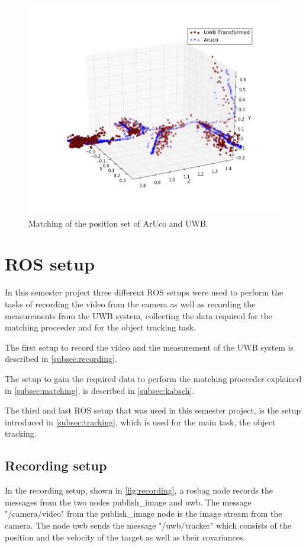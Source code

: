 \begin{figure}[ht!]\centering
	\includegraphics[width=1.0\textwidth]{figures/matching}
	\caption{Matching of the position set of ArUco and UWB.}\label{fig:matching}
\end{figure} 

\section{ROS setup}
In this semester project three different ROS setups were used to perform the tasks of recording the video from the camera as well as recording the measurements from the UWB system, collecting the data required for the matching proceeder and for the object tracking task.

The first setup to record the video and the measurement of the UWB system is described in \autoref{subsec:recording}.

The setup to gain the required data to perform the matching proceeder explained in \autoref{subsec:matching}, is described in \autoref{subsec:kabsch}.

The third and last ROS setup that was used in this semester project, is the setup introduced in \autoref{subsec:tracking}, which is used for the main task, the object tracking.

\subsection{Recording setup}\label{subsec:recording}
In the recording setup, shown in \autoref{fig:recording}, a rosbag node records the messages from the two nodes publish\_image and uwb. The message "/camera/video" from the publish\_image node is the image stream from the camera. The node uwb sends the message "/uwb/tracker" which consists of the position and the velocity of the target as well as their covariances.

